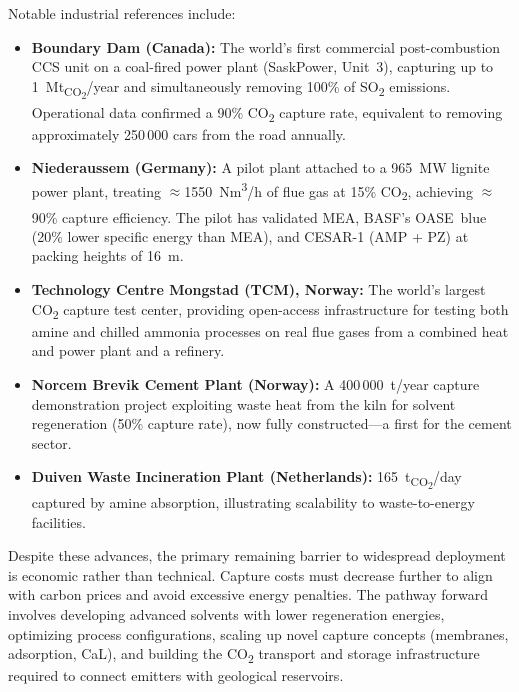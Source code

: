 \medskip

Notable industrial references include:

\begin{itemize}
    \item \textbf{Boundary Dam (Canada):} The world's first commercial post-combustion 
    CCS unit on a coal-fired power plant (SaskPower, Unit~3), capturing up to 
    1~Mt\textsubscript{CO\textsubscript{2}}/year and simultaneously removing 100\% 
    of SO\textsubscript{2} emissions. Operational data confirmed a 90\% CO\textsubscript{2} 
    capture rate, equivalent to removing approximately 250\,000 cars from the road 
    annually.
    
    \item \textbf{Niederaussem (Germany):} A pilot plant attached to a 965~MW lignite 
    power plant, treating $\approx$1550~Nm\textsuperscript{3}/h of flue gas at 15\% 
    CO\textsubscript{2}, achieving $\approx$90\% capture efficiency. The pilot has 
    validated MEA, BASF's OASE\textsuperscript{\textregistered}~blue (20\% lower 
    specific energy than MEA), and CESAR-1 (AMP + PZ) at packing heights of 16~m.
    
    \item \textbf{Technology Centre Mongstad (TCM), Norway:} The world's largest 
    CO\textsubscript{2} capture test center, providing open-access infrastructure 
    for testing both amine and chilled ammonia processes on real flue gases from a 
    combined heat and power plant and a refinery.
    
    \item \textbf{Norcem Brevik Cement Plant (Norway):} A 400\,000~t/year capture 
    demonstration project exploiting waste heat from the kiln for solvent regeneration 
    (50\% capture rate), now fully constructed---a first for the cement sector.
    
    \item \textbf{Duiven Waste Incineration Plant (Netherlands):} 165~t\textsubscript{CO\textsubscript{2}}/day 
    captured by amine absorption, illustrating scalability to waste-to-energy facilities.
\end{itemize}

Despite these advances, the primary remaining barrier to widespread deployment is 
economic rather than technical. Capture costs must decrease further to align with 
carbon prices and avoid excessive energy penalties. The pathway forward involves 
developing advanced solvents with lower regeneration energies, optimizing process 
configurations, scaling up novel capture concepts (membranes, adsorption, CaL), and 
building the CO\textsubscript{2} transport and storage infrastructure required to 
connect emitters with geological reservoirs.

